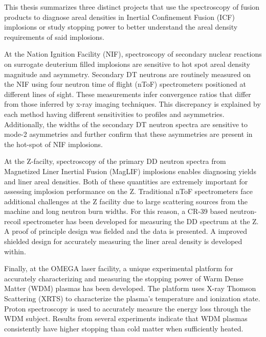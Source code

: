 \begin{abstractpage}
	
	This thesis summarizes three distinct projects that use the spectroscopy of fusion products to diagnose areal densities in Inertial Confinement Fusion (ICF) implosions or study stopping power to better understand the areal density requirements of said implosions. 
	
	At the Nation Ignition Facility (NIF), spectroscopy of secondary nuclear reactions on surrogate deuterium filled implosions are sensitive to hot spot areal density magnitude and asymmetry. Secondary DT neutrons are routinely measured on the NIF using four neutron time of flight (nToF) spectrometers positioned at different lines of sight. These measurements infer convergence ratios that differ from those inferred by x-ray imaging techniques. This discrepancy is explained by each method having different sensitivities to profiles and asymmetries. Additionally, the widths of the secondary DT neutron spectra are sensitive to mode-2 asymmetries and further confirm that these asymmetries are present in the hot-spot of NIF implosions.
	
	At the Z-facilty, spectroscopy of the primary DD neutron spectra from Magnetized Liner Inertial Fusion (MagLIF) implosions enables diagnosing yields and liner areal densities. Both of these quantities are extremely important for assessing implosion performance on the Z. Traditional nToF spectrometers face additional challenges at the Z facility due to large scattering sources from the machine and long neutron burn widths. For this reason, a CR-39 based neutron-recoil spectrometer has been developed for measuring the DD spectrum at the Z. A proof of principle design was fielded and the data is presented. A improved shielded design for accurately measuring the liner areal density is developed within.
	
	Finally, at the OMEGA laser facility, a unique experimental platform for accurately characterizing and measuring the stopping power of Warm Dense Matter (WDM) plasmas has been developed. The platform uses X-ray Thomson Scattering (XRTS) to characterize the plasma's temperature and ionization state. Proton spectroscopy is used to accurately measure the energy loss through the WDM subject. Results from several experiments indicate that WDM plasmas consistently have higher stopping than cold matter when sufficiently heated. 
	
\end{abstractpage}